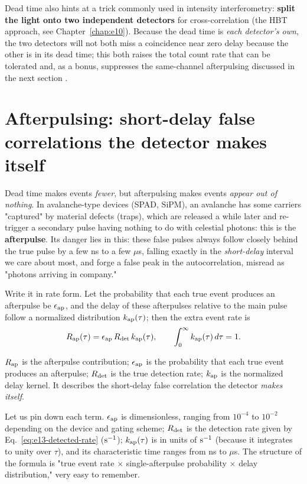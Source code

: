Dead time also hints at a trick commonly used in intensity interferometry: \textbf{split the light onto two independent detectors} for cross-correlation (the HBT approach, see Chapter~\ref{chap:e10}). Because the dead time is \emph{each detector's own}, the two detectors will not both miss a coincidence near zero delay because the other is in its dead time; this both raises the total count rate that can be tolerated and, as a bonus, suppresses the same-channel afterpulsing discussed in the next section \citep{1957RSPSA.242..300B,1996ApOpt..35.1956C,2020RScI...91a3108W}.

\section{Afterpulsing: short-delay false correlations the detector makes itself}
\label{sec:e13-afterpulse}

Dead time makes events \emph{fewer}, but afterpulsing makes events \emph{appear out of nothing}. In avalanche-type devices (SPAD, SiPM), an avalanche has some carriers "captured" by material defects (traps), which are released a while later and re-trigger a secondary pulse having nothing to do with celestial photons: this is the \textbf{afterpulse}. Its danger lies in this: these false pulses always follow closely behind the true pulse by a few ns to a few $\mu$s, falling exactly in the \emph{short-delay} interval we care about most, and forge a false peak in the autocorrelation, misread as "photons arriving in company."

Write it in rate form. Let the probability that each true event produces an afterpulse be $\epsilon_{\rm ap}$, and the delay of these afterpulses relative to the main pulse follow a normalized distribution $k_{\rm ap}(\tau)$; then the extra event rate is
\begin{equation}
  R_{\rm ap}(\tau)=\epsilon_{\rm ap}\,R_{\rm det}\,k_{\rm ap}(\tau),
  \qquad
  \int_0^\infty k_{\rm ap}(\tau)\,d\tau=1.
  \label{eq:e13-afterpulse}
\end{equation}
\begin{formulaexplain}
$R_{\rm ap}$ is the afterpulse contribution; $\epsilon_{\rm ap}$ is the probability that each true event produces an afterpulse; $R_{\rm det}$ is the true detection rate; $k_{\rm ap}$ is the normalized delay kernel. It describes the short-delay false correlation the detector \emph{makes itself}.
\end{formulaexplain}
Let us pin down each term. $\epsilon_{\rm ap}$ is dimensionless, ranging from $10^{-4}$ to $10^{-2}$ depending on the device and gating scheme; $R_{\rm det}$ is the detection rate given by Eq.~\eqref{eq:e13-detected-rate} (${\rm s}^{-1}$); $k_{\rm ap}(\tau)$ is in units of ${\rm s}^{-1}$ (because it integrates to unity over $\tau$), and its characteristic time ranges from ns to $\mu$s. The structure of the formula is "true event rate $\times$ single-afterpulse probability $\times$ delay distribution," very easy to remember.

